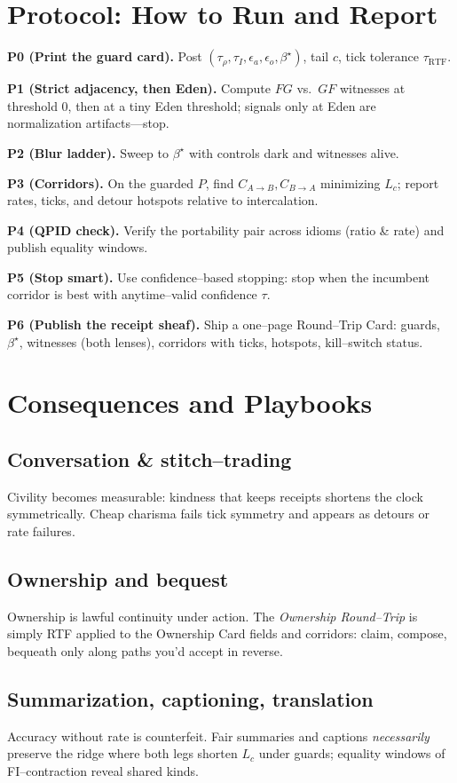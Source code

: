 \documentclass[11pt]{article}
\begin{document}
\section{Protocol: How to Run and Report}
\textbf{P0 (Print the guard card).} Post $(\tau_\rho,\tau_I,\epsilon_a,\epsilon_o,\beta^\star)$, tail $c$, tick tolerance $\tau_{\text{RTF}}$.

\textbf{P1 (Strict adjacency, then Eden).} Compute $FG$ vs.\ $GF$ witnesses at threshold $0$, then at a tiny Eden threshold; signals only at Eden are normalization artifacts---stop.

\textbf{P2 (Blur ladder).} Sweep to $\beta^\star$ with controls dark and witnesses alive.

\textbf{P3 (Corridors).} On the guarded $P$, find $C_{A\to B},C_{B\to A}$ minimizing $L_c$; report rates, ticks, and detour hotspots relative to intercalation.

\textbf{P4 (QPID check).} Verify the portability pair across idioms (ratio \& rate) and publish equality windows.

\textbf{P5 (Stop smart).} Use confidence--based stopping: stop when the incumbent corridor is best with anytime--valid confidence $\tau$.

\textbf{P6 (Publish the receipt sheaf).} Ship a one--page Round--Trip Card: guards, $\beta^\star$, witnesses (both lenses), corridors with ticks, hotspots, kill--switch status.

\section{Consequences and Playbooks}
\subsection{Conversation \& stitch--trading}
Civility becomes measurable: kindness that keeps receipts shortens the clock symmetrically. Cheap charisma fails tick symmetry and appears as detours or rate failures.

\subsection{Ownership and bequest}
Ownership is lawful continuity under action. The \emph{Ownership Round--Trip} is simply RTF applied to the Ownership Card fields and corridors: claim, compose, bequeath only along paths you'd accept in reverse.

\subsection{Summarization, captioning, translation}
Accuracy without rate is counterfeit. Fair summaries and captions \emph{necessarily} preserve the ridge where both legs shorten $L_c$ under guards; equality windows of FI--contraction reveal shared kinds.
\end{document}
